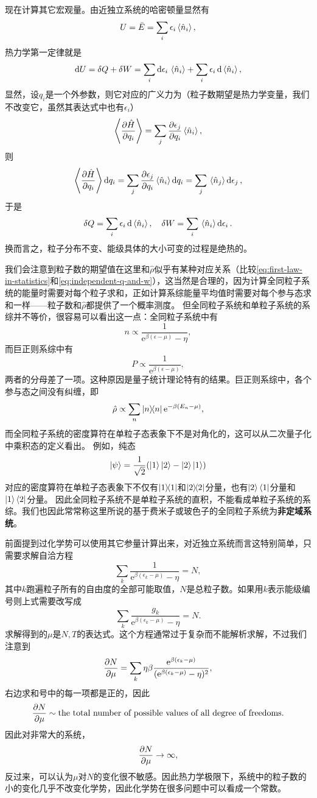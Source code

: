 \documentclass[hyperref, UTF8, a4paper]{ctexart}
\newcommand*{\ee}{\mathrm{e}}
\begin{document}
现在计算其它宏观量。由近独立系统的哈密顿量显然有
\begin{equation}
    U = \bar{E} = \sum_i \epsilon_i \expval*{\hat{n}_i},
\end{equation}
热力学第一定律就是
\[
    \dd{U} = \var{Q} + \var{W} = \sum_i \dd{\epsilon_i} \expval*{\hat{n}_i} + \sum_i \epsilon_i \dd{\expval*{\hat{n}_i}},
\]
显然，设$q_i$是一个外参数，则它对应的广义力为（粒子数期望是热力学变量，我们不改变它，虽然其表达式中也有$\epsilon_i$）
\[
    \expval{\pdv{\hat{H}}{q_i}} = \sum_j \pdv{\epsilon_j}{q_i} \expval*{\hat{n}_i},
\]
则
\[
    \expval{\pdv{\hat{H}}{q_i}} \dd{q_i} = \sum_j \pdv{\epsilon_j}{q_i} \expval*{\hat{n}_i} \dd{q_i} = \sum_j \expval*{\hat{n}_j} \dd{\epsilon_j},
\]
于是
\begin{equation}
    \var{Q} = \sum_i \epsilon_i \dd{\expval*{\hat{n}_i}}, \quad \var{W} = \sum_i \expval*{\hat{n}_i} \dd{\epsilon_i}.
    \label{eq:independent-q-and-w}
\end{equation}
换而言之，粒子分布不变、能级具体的大小可变的过程是绝热的。

我们会注意到粒子数的期望值在这里和$\hat{\rho}$似乎有某种对应关系（比较\eqref{eq:first-law-in-statistics}和\eqref{eq:independent-q-and-w}），这当然是合理的，因为计算全同粒子系统的能量时需要对每个粒子求和，正如计算系综能量平均值时需要对每个参与态求和一样——粒子数和$\hat{\rho}$都提供了一个概率测度。
但全同粒子系统和单粒子系统的系综并不等价，很容易可以看出这一点：全同粒子系统中有
\[
    n \propto \frac{1}{\ee^{\beta (\epsilon - \mu)} - \eta},
\]
而巨正则系综中有
\[
    P \propto \frac{1}{\ee^{\beta (\epsilon - \mu)}},
\]
两者的分母差了一项。这种原因是量子统计理论特有的结果。巨正则系综中，各个参与态之间没有纠缠，即
\[
    \hat{\rho} \propto \sum_n \dyad{n} \ee^{- \beta (E_n - \mu)},
\]
而全同粒子系统的密度算符在单粒子态表象下不是对角化的，这可以从二次量子化中乘积态的定义看出。
例如，纯态
\[
    \ket{\psi} = \frac{1}{\sqrt{2}} (\ket{1} \ket{2} - \ket{2} \ket{1})
\]
对应的密度算符在单粒子态表象下不仅有$\dyad{1}$和$\dyad{2}$分量，也有$\ket{2}\bra{1}$分量和$\ket{1}\bra{2}$分量。
因此全同粒子系统不是单粒子系统的直积，不能看成单粒子系统的系综。我们也因此常常称这里所说的基于费米子或玻色子的全同粒子系统为\textbf{非定域系统}。

前面提到过化学势可以使用其它参量计算出来，对近独立系统而言这特别简单，只需要求解自洽方程
\begin{equation}
    \sum_k \frac{1}{\ee^{\beta (\epsilon_k - \mu)} - \eta} = N,
\end{equation}
其中$k$跑遍粒子所有的自由度的全部可能取值，$N$是总粒子数。如果用$k$表示能级编号则上式需要改写成
\[
    \sum_k \frac{g_k}{\ee^{\beta (\epsilon_k - \mu)} - \eta} = N.
\]
求解得到的$\mu$是$N,T$的表达式。这个方程通常过于复杂而不能解析求解，不过我们注意到
\[
    \pdv{N}{\mu} = \sum_k \eta \beta \frac{\ee^{\beta (\epsilon_k - \mu)}}{(\ee^{ \beta (\epsilon_k - \mu)} - \eta)^2},
\]
右边求和号中的每一项都是正的，因此
\[
    \pdv{N}{\mu} \sim \text{the total number of possible values of all degree of freedoms}.
\]
因此对非常大的系统，
\[
    \pdv{N}{\mu} \to \infty,
\]
反过来，可以认为$\mu$对$N$的变化很不敏感。因此热力学极限下，系统中的粒子数的小的变化几乎不改变化学势，因此化学势在很多问题中可以看成一个常数。
\end{document}
